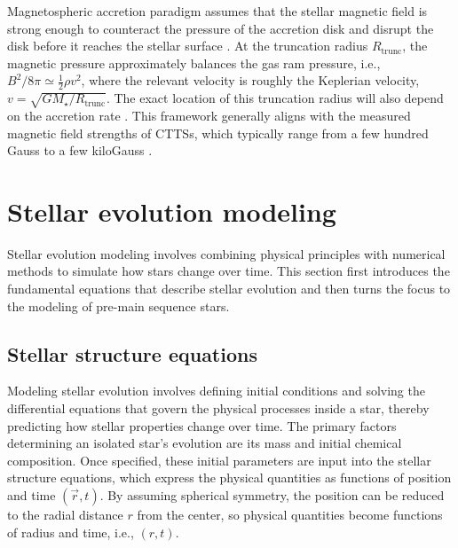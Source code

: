 \documentclass[12pt,a4paper]{article}
\newcommand{\mr}{\mathrm}
\begin{document}

Magnetospheric accretion paradigm assumes that the stellar magnetic field is strong enough to counteract the pressure of the accretion disk and disrupt the disk before it reaches the stellar surface \parencite[e.g.,][]{Koenigl1991}. At the truncation radius $R_\mr{trunc}$, the magnetic pressure approximately balances the gas ram pressure, i.e., $B^2/8\pi \simeq \frac{1}{2}\rho v^2$, where the relevant velocity is roughly the Keplerian velocity, $v = \sqrt{GM_\star/R_\mr{trunc}}$. The exact location of this truncation radius will also depend on the accretion rate \parencite[see Eq.~2.2 in][]{BouvierEtAl2007}. This framework generally aligns with the measured magnetic field strengths of CTTSs, which typically range from a few hundred Gauss to a few kiloGauss \parencite{BouvierEtAl2007,AlencarEtAl2012}. 

\section{Stellar evolution modeling}
\label{sec:stellar_evol}

Stellar evolution modeling involves combining physical principles with numerical methods to simulate how stars change over time. This section first introduces the fundamental equations that describe stellar evolution and then turns the focus to the modeling of pre-main sequence stars.

\subsection{Stellar structure equations}
\label{sec:stellar_evol_formulation}

Modeling stellar evolution involves defining initial conditions and solving the differential equations that govern the physical processes inside a star, thereby predicting how stellar properties change over time. The primary factors determining an isolated star's evolution are its mass and initial chemical composition. Once specified, these initial parameters are input into the stellar structure equations, which express the physical quantities as functions of position and time $(\vec{r}, t)$. By assuming spherical symmetry, the position can be reduced to the radial distance $r$ from the center, so physical quantities become functions of radius and time, i.e., $(r, t)$.
\end{document}
